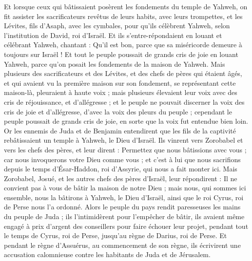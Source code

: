 \begin{multicols}{2}
Et lorsque ceux qui bâtissaient posèrent les fondements du temple de Yahweh, on fit assister les sacrificateurs revêtus de leurs habits, avec leurs trompettes, et les Lévites, fils d'Asaph, avec les cymbales, pour qu'ils célèbrent Yahweh, selon l'institution de David, roi d'Israël.
Et ils s'entre-répondaient en louant et célébrant Yahweh, chantant : Qu'il est bon, parce que sa miséricorde demeure à toujours sur Israël ! Et tout le peuple poussait de grands cris de joie en louant Yahweh, parce qu'on posait les fondements de la maison de Yahweh.
Mais plusieurs des sacrificateurs et des Lévites, et des chefs de pères qui étaient âgés, et qui avaient vu la première maison sur son fondement, se représentant cette maison-là, pleuraient à haute voix ; mais plusieurs élevaient leur voix avec des cris de réjouissance, et d'allégresse ;
et le peuple ne pouvait discerner la voix des cris de joie et d'allégresse, d'avec la voix des pleurs du peuple ; cependant le peuple poussait de grands cris de joie, en sorte que la voix fut entendue bien loin.
\VerseOne{}Or les ennemis de Juda et de Benjamin entendirent que les fils de la captivité rebâtissaient un temple à Yahweh, le Dieu d'Israël.
Ils vinrent vers Zorobabel et vers les chefs des pères, et leur dirent : Permettez que nous bâtissions avec vous ; car nous invoquerons votre Dieu comme vous ; et c'est à lui que nous sacrifions depuis le temps d'Ésar-Haddon, roi d'Assyrie, qui nous a fait monter ici.
Mais Zorobabel, Josué, et les autres chefs des pères d'Israël, leur répondirent : Il ne convient pas à vous de bâtir la maison de notre Dieu ; mais nous, qui sommes ici ensemble, nous la bâtirons à Yahweh, le Dieu d'Israël, ainsi que le roi Cyrus, roi de Perse nous l'a ordonné.
Alors le peuple du pays rendit paresseuses les mains du peuple de Juda ; ils l'intimidèrent pour l'empêcher de bâtir,
ils avaient même engagé à prix d'argent des conseillers pour faire échouer leur projet, pendant tout le temps de Cyrus, roi de Perse, jusqu'au règne de Darius, roi de Perse.
Et pendant le règne d'Assuérus, au commencement de son règne, ils écrivirent une accusation calomnieuse contre les habitants de Juda et de Jérusalem.

\end{multicols}
